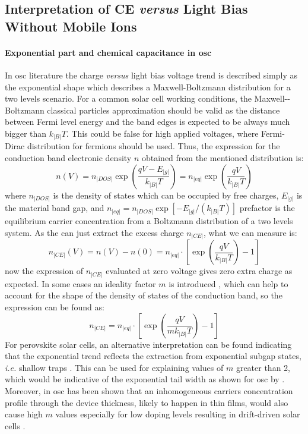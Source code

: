 	\subsection{Interpretation of CE \textsl{versus} Light Bias Without Mobile Ions}

		\paragraph{Exponential part and chemical capacitance in \gls{osc}}\label{ce_exp_osc}
		In \gls{osc} literature the charge \textsl{versus} light bias voltage trend is described simply as the exponential shape which describes a Maxwell\hyp{}Boltzmann distribution for a two levels scenario.
		For a common solar cell working conditions, the Maxwell\hyp{}-Boltzmann classical particles approximation should be valid as the distance between Fermi level energy and the band edges is expected to be always much bigger than $k_|B|T$.
		This could be false for high applied voltages, where Fermi\hyp{}Dirac distribution for fermions should be used.
		Thus, the expression for the conduction band electronic density $n$ obtained from the mentioned distribution is:
		\begin{equation}
			n(V) = n_|DOS| \exp(\frac{qV - E_|g|}{k_|B|T}) = n_|eq| \exp(\frac{qV}{k_|B|T})
		\end{equation}
		where $n_|DOS|$ is the density of states which can be occupied by free charges, $E_|g|$ is the material band gap, and $n_|eq|=n_|DOS|\exp[-E_|g|/(k_|B|T)]$ prefactor is the equilibrium carrier concentration from a Boltzmann distribution of a two levels system. %
		As the  can just extract the excess charge $n_|CE|$, what we can measure is:
		\begin{equation}
			n_|CE|(V) = n(V)-n(0) = n_|eq| \cdot \left[\exp(\frac{qV}{k_|B|T})-1\right]
		\end{equation}
		now the expression of $n_|CE|$ evaluated at zero voltage gives zero extra charge as expected.
		In some cases an ideality factor $m$ is introduced \cite{Kirchartz2012}, which can help to account for the shape of the density of states of the conduction band, so the expression can be found as:
		\begin{equation}\label{eq:ce_osc}
			n_|CE| = n_|eq| \cdot \left[\exp(\frac{qV}{mk_|B|T})-1\right]
		\end{equation}
		For perovskite solar cells, an alternative interpretation can be found indicating that the exponential trend reflects the extraction from exponential subgap states, \textsl{i.e.} shallow traps \cite{Du2018}.
		This can be used for explaining values of $m$ greater than 2, which would be indicative of the exponential tail width as shown for \gls{osc} by .
		Moreover, in \gls{osc} has been shown that an inhomogeneous carriers concentration profile through the device thickness, likely to happen in thin films, would also cause high $m$ values \cite{Kirchartz2012} especially for low doping levels resulting in drift\hyp{}driven solar cells \cite{Deledalle2015,Deledalle2014}.


